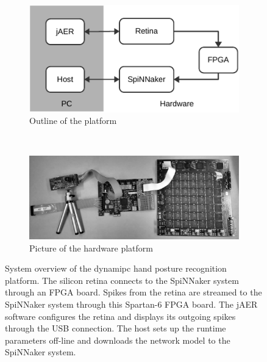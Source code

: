 \documentclass[journal]{journal}
\begin{document}
\begin{figure}
\centering
	\begin{subfigure}[t]{0.4\textwidth}
		\includegraphics[width=\textwidth]{pics/outline.pdf}
	    \caption{Outline of the platform}
	    \label{fig:SysOverViewa}
	\end{subfigure}
	\\
	\begin{subfigure}[t]{0.48\textwidth}
		\includegraphics[width=\textwidth]{pics/outline2.pdf}	    \caption{Picture of the hardware platform}
	    \label{fig:SysOverViewb}
	\end{subfigure}	

\caption{System overview of the dynamipc hand posture recognition platform. 
The silicon retina connects to the SpiNNaker system through an FPGA board. 
Spikes from the retina are streamed to the SpiNNaker system through this Spartan-6 FPGA board.
The jAER software configures the retina and displays its outgoing spikes through the USB connection.
The host sets up the runtime parameters off-line and downloads the network model to the SpiNNaker system.
}
\label{fig:SysOverView}
\end{figure}
\end{document}
